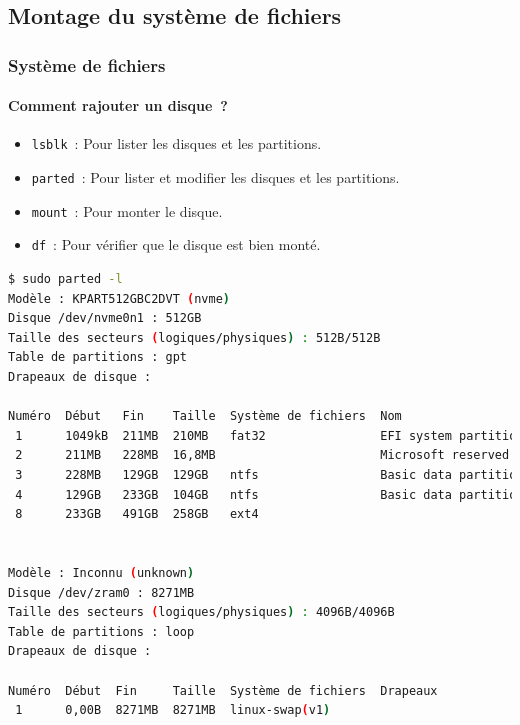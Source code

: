 \documentclass{beamer}
\begin{document}
    \subsection{Montage du système de fichiers}\label{subsec:mount}
    \begin{frame}[fragile]
        \transdissolve
        \frametitle{Système de fichiers}
        \framesubtitle{Comment rajouter un disque~?}
        \begin{scriptsize}
            \begin{itemize}
                \item \lstinline{lsblk}~: Pour lister les disques et les partitions.
                \item \lstinline{parted}~: Pour lister et modifier les disques et les partitions.
                \item \lstinline{mount}~: Pour monter le disque.
                \item \lstinline{df}~: Pour vérifier que le disque est bien monté.
            \end{itemize}
            \begin{lstlisting}[language=bash,basicstyle=\tiny\ttfamily]
$ sudo parted -l
Modèle : KPART512GBC2DVT (nvme)
Disque /dev/nvme0n1 : 512GB
Taille des secteurs (logiques/physiques) : 512B/512B
Table de partitions : gpt
Drapeaux de disque :

Numéro  Début   Fin    Taille  Système de fichiers  Nom                           Drapeaux
 1      1049kB  211MB  210MB   fat32                EFI system partition          démarrage, esp
 2      211MB   228MB  16,8MB                       Microsoft reserved partition  msftres
 3      228MB   129GB  129GB   ntfs                 Basic data partition          msftdata
 4      129GB   233GB  104GB   ntfs                 Basic data partition          msftdata
 8      233GB   491GB  258GB   ext4


Modèle : Inconnu (unknown)
Disque /dev/zram0 : 8271MB
Taille des secteurs (logiques/physiques) : 4096B/4096B
Table de partitions : loop
Drapeaux de disque :

Numéro  Début  Fin     Taille  Système de fichiers  Drapeaux
 1      0,00B  8271MB  8271MB  linux-swap(v1)
            \end{lstlisting}
        \end{scriptsize}
    \end{frame}
\end{document}
